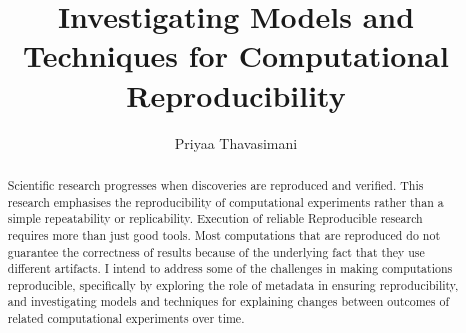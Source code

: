 \documentclass[6pt,,a4paper]{article}
\title{\LARGE{Investigating Models and Techniques for Computational Reproducibility}}
\author{Priyaa Thavasimani}
\begin{document}
\Large
\maketitle
\begin{abstract}\large\noindent
Scientific research progresses when discoveries are reproduced and verified. This research emphasises the reproducibility of computational experiments rather than a simple repeatability or replicability. Execution of reliable Reproducible research requires more than just good tools. Most computations that are reproduced do not guarantee the correctness of results because of the underlying fact that they use different artifacts. I intend to address some of the challenges in making computations reproducible, specifically by exploring the role of metadata in ensuring reproducibility, and investigating models and techniques for explaining changes between outcomes of related computational experiments over time.
\end{abstract}
\end{document}
